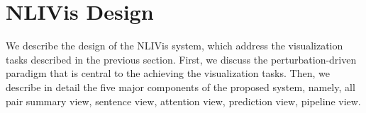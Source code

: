 
\section{NLIVis Design}
We describe the design of the NLIVis system, which address the visualization tasks described in the previous section. 
%
First, we discuss the perturbation-driven paradigm that is central to the achieving the visualization tasks.
%
Then, we describe in detail the five major components of the proposed system, namely, all pair summary view, sentence view, attention view, prediction view, pipeline view. 

%
